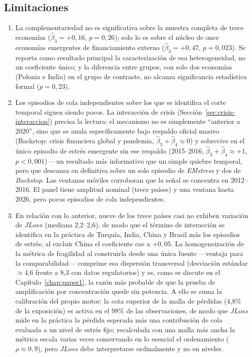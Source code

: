 \subsection{Limitaciones}

\begin{enumerate}
\item La complementariedad no es significativa sobre la muestra completa de trece economías ($\hat\beta_3=+0{,}16$, $p=0{,}26$); solo lo es sobre el núcleo de once economías emergentes de financiamiento externo ($\hat\beta_3=+0{,}47$, $p=0{,}023$). Se reporta como resultado principal la caracterización de esa heterogeneidad, no un coeficiente único; y la diferencia entre grupos, con solo dos economías (Polonia e India) en el grupo de contraste, no alcanza significancia estadística formal ($p=0{,}23$).

\item Los episodios de cola independientes sobre los que se identifica el corte temporal siguen siendo pocos. La interacción de crisis (Sección~\ref{sec:crisis-interaccion}) precisa la lectura: el mecanismo no es simplemente ``anterior a 2020'', sino que se anula específicamente bajo respaldo oficial masivo (Backstop: crisis financiera global y pandemia, $\hat\beta_3+\hat\beta_4\approx0$) y sobrevive en el único episodio de estrés emergente sin ese respaldo (2015--2016, $\hat\beta_3+\hat\beta_4\approx+1$, $p<0{,}001$) —un resultado más informativo que un simple quiebre temporal, pero que descansa en definitiva sobre un solo episodio de \textit{EMstress} y dos de \textit{Backstop}. Las ventanas móviles corroboran que la señal se concentra en 2012--2016. El panel tiene amplitud nominal (trece países) y una ventana hasta 2026, pero pocos episodios de cola independientes.

\item En relación con lo anterior, nueve de los trece países casi no exhiben variación de $JLoss$ (mediana 2,2--2,6), de modo que el término de interacción se identifica en la práctica de Turquía, India, China y Brasil más los episodios de estrés; al excluir China el coeficiente cae a $+0{,}05$. La homogeneización de la métrica de fragilidad al construirla desde una única fuente —ventaja para la comparabilidad— comprime esa dispersión transversal (desviación estándar $\approx$4,6 frente a 8,3 con datos regulatorios) y es, como se discute en el Capítulo~\ref{chap:paper1}, la razón más probable de que la prueba de amplificación por concentración quede sin potencia. A ello se suma la calibración del propio motor: la cota superior de la malla de pérdidas (4,8\% de la exposición) es activa en el 98\% de las observaciones, de modo que $JLoss$ mide en la práctica la pérdida esperada más una contribución de cola evaluada a un nivel de estrés fijo; recalculada con una malla más ancha la métrica escala varias veces conservando en lo esencial el ordenamiento ($\rho\approx0{,}9$), pero $JLoss$ debe interpretarse ordinalmente y no en niveles.


\end{enumerate}
